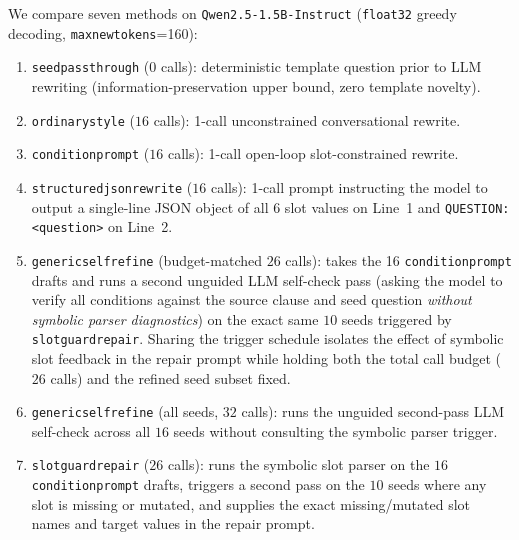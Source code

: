 \documentclass[10pt,twocolumn]{article}
\renewcommand{\_}{\textunderscore\allowbreak}
\begin{document}
We compare seven methods on \texttt{Qwen2.5-1.5B-Instruct} (\texttt{float32} greedy decoding, \texttt{max\_new\_tokens}=160):
\begin{enumerate}[leftmargin=*,nosep]
  \item \texttt{seed\_passthrough} ($0$ calls): deterministic template question prior to LLM rewriting (information-preservation upper bound, zero template novelty).
  \item \texttt{ordinary\_style} ($16$ calls): 1-call unconstrained conversational rewrite.
  \item \texttt{condition\_prompt} ($16$ calls): 1-call open-loop slot-constrained rewrite.
  \item \texttt{structured\_json\_rewrite} ($16$ calls): 1-call prompt instructing the model to output a single-line JSON object of all 6 slot values on Line~1 and \texttt{QUESTION: <question>} on Line~2.
  \item \texttt{generic\_self\_refine} (budget-matched $26$ calls): takes the 16 \texttt{condition\_prompt} drafts and runs a second unguided LLM self-check pass (asking the model to verify all conditions against the source clause and seed question \emph{without symbolic parser diagnostics}) on the exact same $10$ seeds triggered by \texttt{slot\_guard\_repair}. Sharing the trigger schedule isolates the effect of symbolic slot feedback in the repair prompt while holding both the total call budget ($26$ calls) and the refined seed subset fixed.
  \item \texttt{generic\_self\_refine} (all seeds, $32$ calls): runs the unguided second-pass LLM self-check across all $16$ seeds without consulting the symbolic parser trigger.
  \item \texttt{slot\_guard\_repair} ($26$ calls): runs the symbolic slot parser on the $16$ \texttt{condition\_prompt} drafts, triggers a second pass on the $10$ seeds where any slot is missing or mutated, and supplies the exact missing/mutated slot names and target values in the repair prompt.
\end{enumerate}
\end{document}
